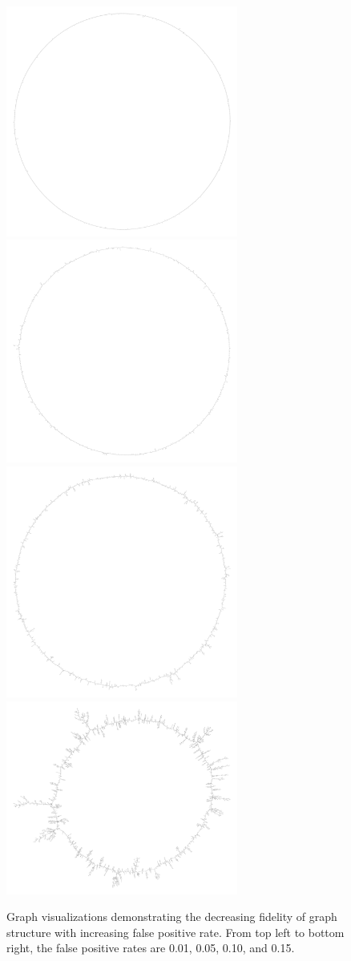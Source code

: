 \documentclass[12pt]{article} \usepackage{simplemargins}
\begin{document}
\begin{figure}
\includegraphics[width=3in]{figures/f3b001}
\includegraphics[width=3in]{figures/f3b005}\\
\includegraphics[width=3in]{figures/f3b010}
\includegraphics[width=3in]{figures/f3b015}
\caption{Graph visualizations demonstrating the decreasing 
fidelity of graph structure with increasing false positive rate. From 
top left to bottom right, the false positive rates are 0.01, 0.05, 0.10, 
and 0.15.}
\end{figure}
\end{document}
